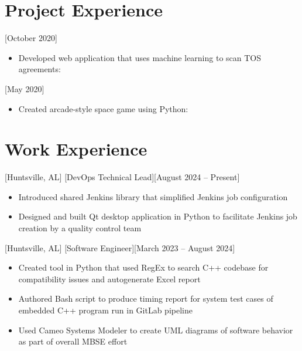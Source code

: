 \documentclass[hidelinks, 11pt]{article}
\begin{document}
\section{Project Experience}

[October 2020]

\begin{itemize}
	\item Developed web application that uses machine learning to scan TOS agreements: 
\end{itemize}

[May 2020]

\begin{itemize}
	\item Created arcade-style space game using Python: 
\end{itemize}

\section{Work Experience}

[Huntsville, AL]
[DevOps Technical Lead][August 2024 -- Present]

\begin{itemize}
	\item Introduced shared Jenkins library that simplified Jenkins job configuration
	\item Designed and built Qt desktop application in Python to facilitate Jenkins job creation by a quality control team
\end{itemize}

[Huntsville, AL]
[Software Engineer][March 2023 -- August 2024]

\begin{itemize}
	\item Created tool in Python that used RegEx to search C++ codebase for compatibility issues and autogenerate Excel report
	\item Authored Bash script to produce timing report for system test cases of embedded C++ program run in GitLab pipeline
	\item Used Cameo Systems Modeler to create UML diagrams of software behavior as part of overall MBSE effort
\end{itemize}
\end{document}
